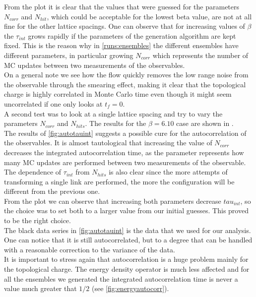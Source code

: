 From the plot it is clear that the values that were guessed for the parameters $N_{corr}$ and $N_{hit}$, which could be acceptable for the lowest beta value, are not at all fine for the other lattice spacings. One can observe that for increasing values of $\beta$ the $\tau_{int}$ grows rapidly if the parameters of the generation algorithm are kept fixed.  This is the reason why in \cref{runs:ensembles} the different ensembles have different parameters, in particular growing $N_{corr}$ which represents the number of MC updates between two measurements of the  observables.\\
On a general note we see how the flow quickly removes the low range noise from the observable through the smearing effect, making it clear that the topological charge is highly correlated in Monte Carlo time even though it might seem uncorrelated if one only looks at $t_f = 0$. \\
A second test was to look at a single lattice spacing and try to vary the parameters $N_{corr}$ and $N_{hits}$. The results for the $\beta=6.10$ case are shown in . 
\\
The results of \cref{fig:autotauint} suggests a possible cure for the autocorrelation of the observables. It is almost tautological that increasing the value of $N_{corr}$ decreases the integrated autocorrelation time, as the parameter represents how many MC updates are performed between two measurements of the observable. The dependence of $\tau_{int}$ from $N_{hits}$ is also clear since the more attempts of transforming a single link are performed, the more the configuration will be different from the previous one. \\
From the plot we can observe that increasing both parameters decrease $tau_{int}$, so the choice was to set both to a larger value from our initial guesses. This proved to be the right choice. \\
The black data series in  \cref{fig:autotauint} is the data that we used for our analysis. One can notice that it is still autocorrelated, but to a degree that can be handled with a reasonable correction to the variance of the data. \\
It is important to stress again that autocorrelation is a huge problem mainly for the topological charge. The energy density operator is much less affected and for all the ensembles we generated the integrated autocorrelation time is never a value much greater that $1/2$ (see \cref{fig:energyautocorr}). 


